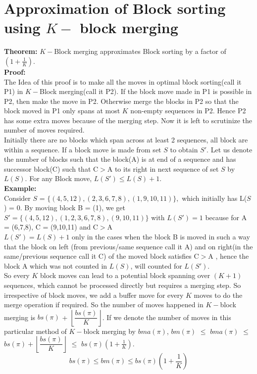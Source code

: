 \documentclass[BTech]{iitmdiss}
\begin{document}
\section{Approximation of Block sorting using $K-$ block merging}
\textbf{Theorem:} $K-$Block merging approximates Block sorting by a factor of $(1+\frac{1}{K})$.\\
\textbf{Proof:}\\
The Idea of this proof is to make all the moves in optimal block sorting(call it P1) in $K-$Block merging(call it P2). If the block move made in P1 is possible in P2, then make the move in P2. Otherwise merge the blocks in P2 so that the block moved in P1 only spans at most $K$ non-empty sequences in P2. Hence P2 has some extra moves because of the merging step. Now it is left to scrutinize the number of moves required.\\
Initially there are no blocks which span across at least 2 sequences, all block are within a sequence. If a block move is made from set $S$ to obtain $S'$. Let us denote the number of blocks such that the block(A) is at end of a sequence and has successor block(C) such that C$>$A to its right in next sequence of set $S$ by $L(S)$. For any Block move, $L(S') \leq L(S) + 1.$\\
\textbf{Example:}\\
Consider $S$ = $\{(4,5,12),(2,3,6,7,8),(1,9,10,11)\},$ which initially has L($S$) = 0. By moving block B = (1), we get $S' = \{(4,5,12),(1,2,3,6,7,8),(9,10,11)\}$ with $L(S') = 1$ because for A = (6,7,8), C = (9,10,11) and C$>$A \\
$L(S') = L(S) + 1$ only in the cases when the block B is moved in such a way that the block on left (from previous/same sequence call it A) and on right(in the same/previous sequence call it C) of the moved block satisfies C$>$A , hence the block A which was not counted in $L(S)$, will counted for $L(S')$.\\
So every $K$ block moves can lead to a potential block spanning over $(K+1)$ sequences, which cannot be processed directly but requires a merging step. So irrespective of block moves, we add a buffer move for every $K$ moves to do the merge operation if required. So the number of moves happened in $K-$block merging is $bs(\pi)$ + $\left\lfloor\dfrac{bs(\pi)}{K}\right\rfloor$. If we denote the number of moves in this particular method of $K-$block merging by $bma(\pi)$, $bm(\pi)$ $\leq$  $bma(\pi)$ $\leq$  $bs(\pi) + \left\lfloor\dfrac{bs(\pi)}{K}\right\rfloor$ $\leq$ $bs(\pi)(1+\frac{1}{K})$.
$$bs(\pi) \leq bm(\pi) \leq bs(\pi)(1+\frac{1}{K})$$
\end{document}

